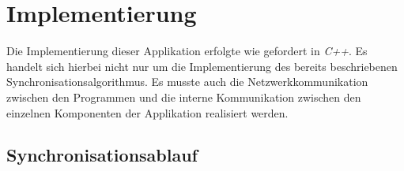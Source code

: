\section{Implementierung}
\label{cha:implementierung}

Die Implementierung dieser Applikation erfolgte wie gefordert in \textsl{C++}. Es handelt sich hierbei nicht nur um die Implementierung des bereits 
beschriebenen Synchronisationsalgorithmus. Es musste auch die Netzwerkkommunikation zwischen den Programmen und die interne Kommunikation zwischen den 
einzelnen Komponenten der Applikation realisiert werden.

\subsection{Synchronisationsablauf}
\label{sec:sychronisierung}

